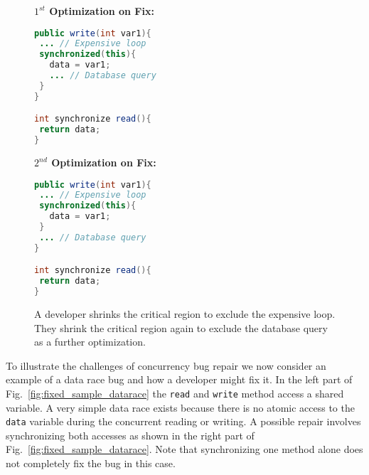 \begin{figure}[t!]
\begin{minipage}{5cm}
\footnotesize{\textbf{$1^{st}$ Optimization on Fix:}}
\begin{lstlisting}[language=Java, morekeywords={synchronize}]
public write(int var1){
 ... // Expensive loop
 synchronized(this){
   data = var1;
   ... // Database query
 }
}

int synchronize read(){
 return data;
}
\end{lstlisting}
\end{minipage}\hfill
\begin{minipage}{5cm}
\footnotesize{\textbf{$2^{nd}$ Optimization on Fix:}}
\begin{lstlisting}[language=Java, morekeywords={synchronize}]
public write(int var1){
 ... // Expensive loop
 synchronized(this){
   data = var1;
 }
 ... // Database query
}

int synchronize read(){
 return data;
}
\end{lstlisting}
\end{minipage}
\caption{A developer shrinks the critical region to exclude the expensive loop.
They shrink the critical region again to exclude the database query as a
further optimization.}
\label{fig:optimized_sample_datarace}
\end{figure}


To illustrate the challenges of concurrency bug repair we now consider an example of a data race bug and how a developer might fix it. In the left part of Fig.~\ref{fig:fixed_sample_datarace} the
\texttt{read} and \texttt{write} method access a shared variable. A very simple
data race exists because there is no atomic access to the \texttt{data}
variable during the concurrent reading or writing.
A possible repair involves synchronizing both accesses as shown in the right part of
Fig.~\ref{fig:fixed_sample_datarace}. Note that synchronizing one method alone does not
completely fix the bug in this case.


